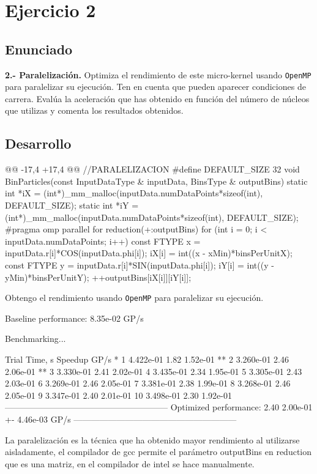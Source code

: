 \section{Ejercicio 2}
\subsection{Enunciado}
\begin{ejer}
    \textbf{2.- Paralelización.} Optimiza el rendimiento de este micro-kernel usando \texttt{OpenMP} para paralelizar su
    ejecución. Ten en cuenta que pueden aparecer condiciones de carrera. Evalúa la aceleración que
    has obtenido en función del número de núcleos que utilizas y comenta los resultados obtenidos.
\end{ejer}
\subsection{Desarrollo}
\begin{listing}[firstnumber=16]
    @@ -17,4 +17,4 @@
    //PARALELIZACION
    #define DEFAULT_SIZE 32
    void BinParticles(const InputDataType & inputData, BinsType & outputBins) {
        static int *iX = (int*)_mm_malloc(inputData.numDataPoints*sizeof(int), DEFAULT_SIZE); 
        static int *iY = (int*)_mm_malloc(inputData.numDataPoints*sizeof(int), DEFAULT_SIZE);
    #pragma omp parallel for reduction(+:outputBins)
        for (int i = 0; i < inputData.numDataPoints; i++) {
            const FTYPE x = inputData.r[i]*COS(inputData.phi[i]); 
            iX[i] = int((x - xMin)*binsPerUnitX);
            const FTYPE y = inputData.r[i]*SIN(inputData.phi[i]); 
            iY[i] = int((y - yMin)*binsPerUnitY); 
            ++outputBins[iX[i]][iY[i]];
        } 
    }
\end{listing}
\par Obtengo el rendimiento usando \texttt{OpenMP} para paralelizar su ejecución.
\begin{listing}[style=consola]
    Baseline performance: 8.35e-02 GP/s
    
    Benchmarking...
    
    Trial    Time, s Speedup    GP/s *
        1  4.422e-01    1.82 1.52e-01 **
        2  3.260e-01    2.46 2.06e-01 **
        3  3.330e-01    2.41 2.02e-01
        4  3.435e-01    2.34 1.95e-01
        5  3.305e-01    2.43 2.03e-01
        6  3.269e-01    2.46 2.05e-01
        7  3.381e-01    2.38 1.99e-01
        8  3.268e-01    2.46 2.05e-01
        9  3.347e-01    2.40 2.01e-01
        10 3.498e-01    2.30 1.92e-01
    --------------------------------------------------------- 
    Optimized performance: 2.40 2.00e-01 +- 4.46e-03 GP/s
    ---------------------------------------------------------
\end{listing}
\par La paralelización es la técnica que ha obtenido mayor rendimiento al utilizarse aisladamente, 
el compilador de gcc permite el parámetro outputBins en reduction que es una matriz, en el compilador 
de intel se hace manualmente.
